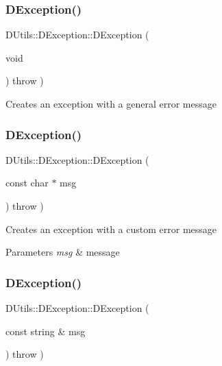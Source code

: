 \subsubsection{\texorpdfstring{D\+Exception()}{DException()}\hspace{0.1cm}{\footnotesize\ttfamily [1/3]}}
{\footnotesize\ttfamily D\+Utils\+::\+D\+Exception\+::\+D\+Exception (\begin{DoxyParamCaption}\item[{void}]{ }\end{DoxyParamCaption}) throw  ) \hspace{0.3cm}{\ttfamily [inline]}}

Creates an exception with a general error message \mbox{\label{classDUtils_1_1DException_aba7bdd9f0c908590dc48cfacb50efc56}} 
\subsubsection{\texorpdfstring{D\+Exception()}{DException()}\hspace{0.1cm}{\footnotesize\ttfamily [2/3]}}
{\footnotesize\ttfamily D\+Utils\+::\+D\+Exception\+::\+D\+Exception (\begin{DoxyParamCaption}\item[{const char $\ast$}]{msg }\end{DoxyParamCaption}) throw  ) \hspace{0.3cm}{\ttfamily [inline]}}

Creates an exception with a custom error message 
\begin{DoxyParams}{Parameters}
{\em msg} & message \\
\hline
\end{DoxyParams}
\mbox{\label{classDUtils_1_1DException_a611f325f78d0e79b3bac5234b3f9ff99}} 
\subsubsection{\texorpdfstring{D\+Exception()}{DException()}\hspace{0.1cm}{\footnotesize\ttfamily [3/3]}}
{\footnotesize\ttfamily D\+Utils\+::\+D\+Exception\+::\+D\+Exception (\begin{DoxyParamCaption}\item[{const string \&}]{msg }\end{DoxyParamCaption}) throw  ) \hspace{0.3cm}{\ttfamily [inline]}}

